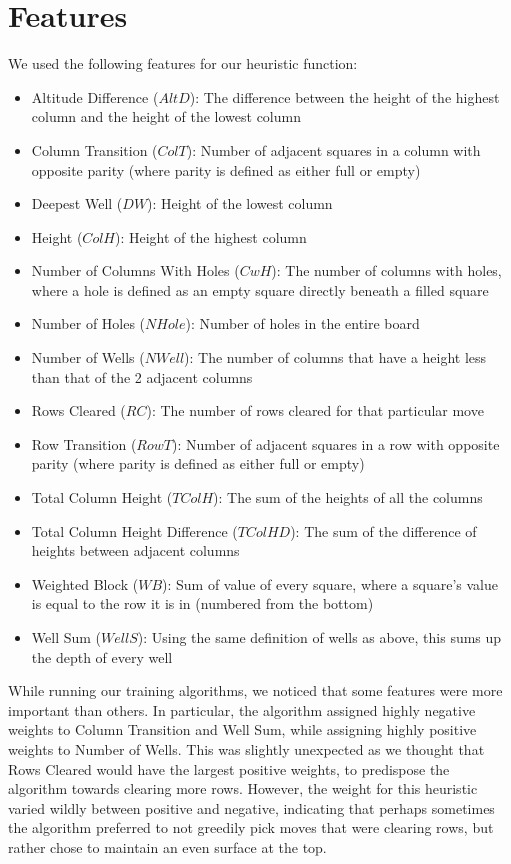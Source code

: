 \documentclass{article}
\begin{document}
\section{Features}
We used the following features for our heuristic function:
\begin{itemize}
	\item Altitude Difference ($AltD$): The difference between the height of
		the highest column and the height of the lowest column
	\item Column Transition ($ColT$): Number of adjacent squares in a column
		with opposite parity (where parity is defined as either full or empty)
	\item Deepest Well ($DW$): Height of the lowest column
	\item Height ($ColH$): Height of the highest column
	\item Number of Columns With Holes ($CwH$): The number of columns with
		holes, where a hole is defined as an empty square directly beneath a
		filled square
	\item Number of Holes ($NHole$): Number of holes in the entire board
	\item Number of Wells ($NWell$): The number of columns that have a height
		less than that of the 2 adjacent columns
	\item Rows Cleared ($RC$): The number of rows cleared for that particular move
	\item Row Transition ($RowT$): Number of adjacent squares in a row with
		opposite parity (where parity is defined as either full or empty)
	\item Total Column Height ($TColH$): The sum of the heights of all the columns
	\item Total Column Height Difference ($TColHD$): The sum of the difference
		of heights between adjacent columns
	\item Weighted Block ($WB$): Sum of value of every square, where a square's
		value is equal to the row it is in (numbered from the bottom)
	\item Well Sum ($WellS$): Using the same definition of wells as above, this
		sums up the depth of every well
\end{itemize}

While running our training algorithms, we noticed that some features were more
important than others. In particular, the algorithm assigned highly negative
weights to Column Transition and Well Sum, while assigning highly positive
weights to Number of Wells. This was slightly unexpected as we thought that
Rows Cleared would have the largest positive weights, to predispose the
algorithm towards clearing more rows. However, the weight for this heuristic
varied wildly between positive and negative, indicating that perhaps sometimes
the algorithm preferred to not greedily pick moves that were clearing rows, but
rather chose to maintain an even surface at the top.
\end{document}
